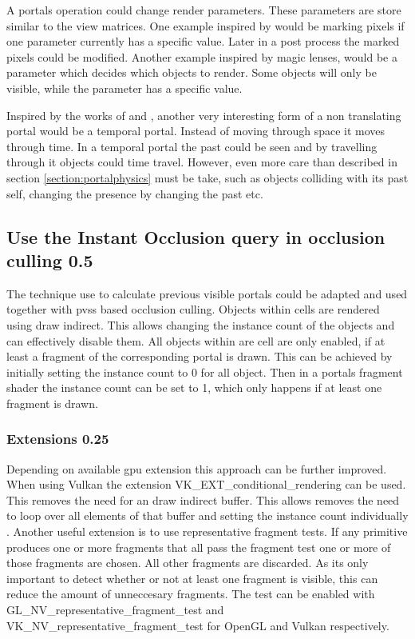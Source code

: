A portals operation could change render parameters. These parameters are store similar to the view matrices. One example inspired by \cite{borst:2009:real} would be marking pixels if one parameter currently has a specific value. Later in a post process the marked pixels could be modified. Another example inspired by magic lenses, would be a parameter which decides which objects to render. Some objects will only be visible, while the parameter has a specific value.

Inspired by the works of \textcite{ryall:2005:temporal} and \textcite{tiesel:2009:composable}, another very interesting form of a non translating portal would be a temporal portal. Instead of moving through space it moves through time. In a temporal portal the past could be seen and by travelling through it objects could time travel. However, even more care than described in section \ref{section:portalphysics} must be take, such as objects colliding with its past self, changing the presence by changing the past etc.



\subsection{Use the Instant Occlusion query in occlusion culling 0.5}
The technique use to calculate previous visible portals could be adapted and used together with \glspl{pvs} based occlusion culling. Objects within cells are rendered using draw indirect. This allows changing the instance count of the objects and can effectively disable them. All objects within are cell are only enabled, if at least a fragment of the corresponding portal is drawn. This can be achieved by initially setting the instance count to 0 for all object. Then in a portals fragment shader the instance count can be set to 1, which only happens if at least one fragment is drawn.

\subsubsection{Extensions 0.25}
Depending on  available \gls{gpu} extension this approach can be further improved. When using Vulkan the extension VK\_EXT\_conditional\_rendering can be used. This removes the need for an draw indirect buffer. This allows removes the need to loop over all elements of that buffer and setting the instance count individually \cite{khronos:vulkan:spec1.1}.
Another useful extension is to use representative fragment tests. If any primitive produces one or more fragments that all pass the fragment test one or more of those fragments are chosen. All other fragments are discarded. As its only important to detect whether or not at least one fragment is visible, this can reduce the amount of unneccesary fragments. The test can be enabled with GL\_NV\_representative\_fragment\_test and VK\_NV\_representative\_fragment\_test for OpenGL \cite{khronos:openGL:representative} and Vulkan\cite{khronos:vulkan:spec1.1} respectively.


